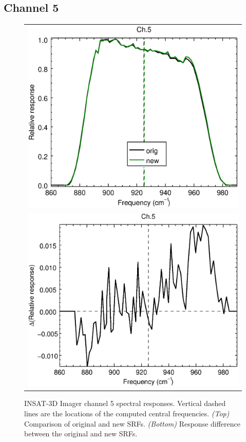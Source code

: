 \subsection{Channel 5}
\begin{figure}[H]
  \label{fig:imgr_ch5}
  \centering
  \begin{tabular}{c}
    \includegraphics[scale=0.55]{graphics/imgr/srf/imgr_insat3d-5.eps} \\
    \includegraphics[scale=0.55]{graphics/imgr/srf/imgr_insat3d-5.difference.eps}
  \end{tabular}
  \caption{INSAT-3D Imager channel 5 spectral responses. Vertical dashed lines are the locations of the computed central frequencies. \emph{(Top)} Comparison of original and new SRFs. \emph{(Bottom)} Response difference between the original and new SRFs.}
\end{figure}

